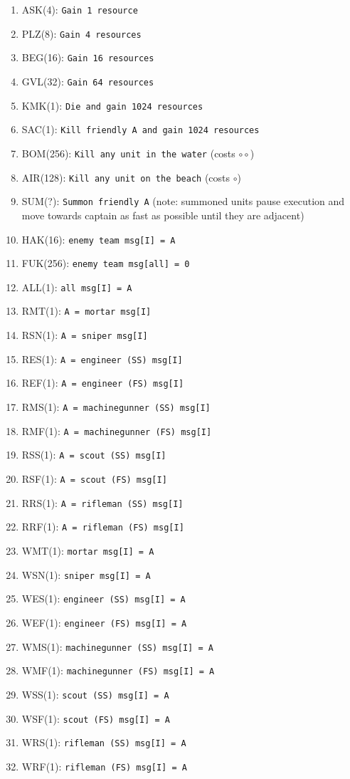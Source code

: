 \documentclass{article}
\begin{document}
\begin{enumerate}[noitemsep]
    \item ASK(4): \texttt{Gain 1 resource}
    \item PLZ(8): \texttt{Gain 4 resources}
    \item BEG(16): \texttt{Gain 16 resources}
    \item GVL(32): \texttt{Gain 64 resources}
    \item KMK(1): \texttt{Die and gain 1024 resources}
    \item SAC(1): \texttt{Kill friendly A and gain 1024 resources}
    \item BOM(256): \texttt{Kill any unit in the water} (costs $\circ\circ$)
    \item AIR(128): \texttt{Kill any unit on the beach} (costs $\circ$)
    \item SUM(?): \texttt{Summon friendly A} (note: summoned units pause
        execution and move towards captain as fast as possible until they
        are adjacent)
    \item HAK(16): \texttt{enemy team msg[I] = A}
    \item FUK(256): \texttt{enemy team msg[all] = 0}
    \item ALL(1): \texttt{all msg[I] = A}
    \item RMT(1): \texttt{A = mortar msg[I]}
    \item RSN(1): \texttt{A = sniper msg[I]}
    \item RES(1): \texttt{A = engineer (SS) msg[I]}
    \item REF(1): \texttt{A = engineer (FS) msg[I]}
    \item RMS(1): \texttt{A = machinegunner (SS) msg[I]}
    \item RMF(1): \texttt{A = machinegunner (FS) msg[I]}
    \item RSS(1): \texttt{A = scout (SS) msg[I]}
    \item RSF(1): \texttt{A = scout (FS) msg[I]}
    \item RRS(1): \texttt{A = rifleman (SS) msg[I]}
    \item RRF(1): \texttt{A = rifleman (FS) msg[I]}
    \item WMT(1): \texttt{mortar msg[I] = A}
    \item WSN(1): \texttt{sniper msg[I] = A}
    \item WES(1): \texttt{engineer (SS) msg[I] = A}
    \item WEF(1): \texttt{engineer (FS) msg[I] = A}
    \item WMS(1): \texttt{machinegunner (SS) msg[I] = A}
    \item WMF(1): \texttt{machinegunner (FS) msg[I] = A}
    \item WSS(1): \texttt{scout (SS) msg[I] = A}
    \item WSF(1): \texttt{scout (FS) msg[I] = A}
    \item WRS(1): \texttt{rifleman (SS) msg[I] = A}
    \item WRF(1): \texttt{rifleman (FS) msg[I] = A}
\end{enumerate}
\end{document}
